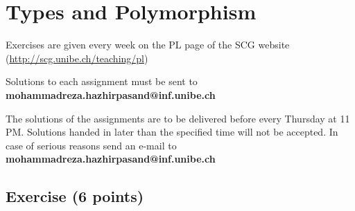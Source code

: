 \documentclass [11pt, a4wide, twoside]{article}
\begin{document}
\section*{\space{} Types and Polymorphism}


\begin{myitemize}
\item Exercises are given every week on the PL page of the SCG website \\ (\url{http://scg.unibe.ch/teaching/pl})
\item Solutions to each assignment must be sent to \textbf{mohammadreza.hazhirpasand@inf.unibe.ch}
\item The solutions of the assignments are to be delivered before every Thursday at 11 PM. Solutions handed in later than the specified time will not be accepted. In case of serious reasons send an e-mail to  \textbf{mohammadreza.hazhirpasand@inf.unibe.ch}
\end{myitemize}


\subsection*{Exercise (6 points)}
\end{document}
